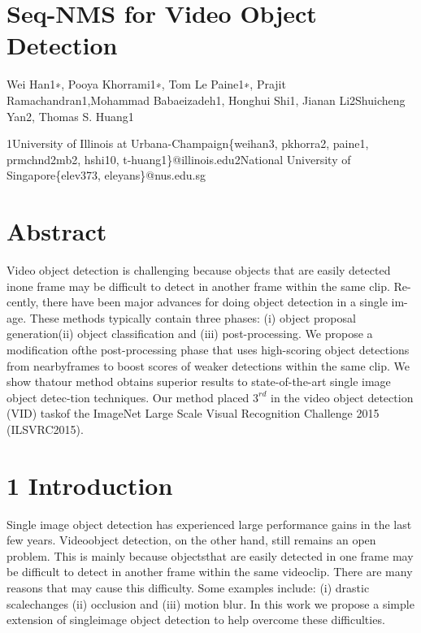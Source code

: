 \documentclass[
  10
]{article}
\author{}
\date{}
\newcounter{none} %
\begin{document}
\section{Seq-NMS for Video Object
Detection}\label{seq-nms-for-video-object-detection}

Wei Han1∗, Pooya Khorrami1∗, Tom Le Paine1∗, Prajit
Ramachandran1,Mohammad Babaeizadeh1, Honghui Shi1, Jianan Li2Shuicheng
Yan2, Thomas S. Huang1

1University of Illinois at Urbana-Champaign\{weihan3, pkhorra2, paine1,
prmchnd2mb2, hshi10, t-huang1\}@illinois.edu2National University of
Singapore\{elev373, eleyans\}@nus.edu.sg

\section{Abstract}\label{abstract}

Video object detection is challenging because objects that are easily
detected inone frame may be difficult to detect in another frame within
the same clip. Re-cently, there have been major advances for doing
object detection in a single im-age. These methods typically contain
three phases: (i) object proposal generation(ii) object classification
and (iii) post-processing. We propose a modification ofthe
post-processing phase that uses high-scoring object detections from
nearbyframes to boost scores of weaker detections within the same clip.
We show thatour method obtains superior results to state-of-the-art
single image object detec-tion techniques. Our method placed
\(3 ^ { r d }\) in the video object detection (VID) taskof the ImageNet
Large Scale Visual Recognition Challenge 2015 (ILSVRC2015).

\section{1 Introduction}\label{introduction}

Single image object detection has experienced large performance gains in
the last few years. Videoobject detection, on the other hand, still
remains an open problem. This is mainly because objectsthat are easily
detected in one frame may be difficult to detect in another frame within
the same videoclip. There are many reasons that may cause this
difficulty. Some examples include: (i) drastic scalechanges (ii)
occlusion and (iii) motion blur. In this work we propose a simple
extension of singleimage object detection to help overcome these
difficulties.
\end{document}
